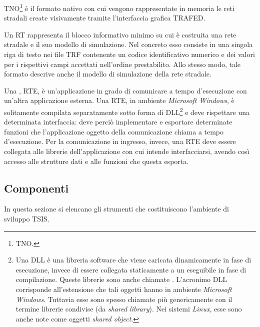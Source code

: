 \begin{definizione}\label{defn:tno-format}
\acs{TNO}\footnote{\acf{TNO}.} è il formato nativo con cui vengono rappresentate in memoria le reti stradali create visivamente tramite l'interfaccia grafica \acs{TRAFED}.
\end{definizione}

\begin{definizione}[\acl{RT}]\label{defn:tsis-rt}
Un \acf{RT} rappresenta il blocco informativo minimo su cui è costruita una rete stradale e il suo modello di simulazione. Nel concreto esso consiste in una singola riga di testo nei file \acs{TRF} contenente un codice identificativo numerico e dei valori per i rispettivi campi accettati nell'ordine prestabilito. Allo stesso modo, tale formato descrive anche il modello di simulazione della rete stradale.
\end{definizione}

\begin{definizione}\label{defn:rte}
Una , \acl{RTE}, è un'applicazione in grado di comunicare a tempo d'esecuzione con un'altra applicazione esterna. Una \acs{RTE}, in ambiente \emph{Microsoft Windows}, è solitamente compilata separatamente sotto forma di \acs{DLL}\footnote{Una \acf{DLL} è una libreria software che viene caricata dinamicamente in fase di esecuzione, invece di essere collegata staticamente a un eseguibile in fase di compilazione. Queste librerie sono anche chiamate . L'acronimo \acs{DLL} corrisponde all'estensione che tali oggetti hanno in ambiente \emph{Microsoft Windows}. Tuttavia esse sono spesso chiamate più genericamente con il termine librerie condivise (da \emph{shared library}). Nei sistemi \emph{Linux}, esse sono anche note come oggetti \emph{shared object}.} e deve rispettare una determinata interfaccia: deve perciò implementare e esportare determinate funzioni che l'applicazione oggetto della comunicazione chiama a tempo d'esecuzione. Per la comunicazione in ingresso, invece, una \acs{RTE} deve essere collegata alle librerie dell'applicazione con cui intende interfacciarsi, avendo così accesso alle strutture dati e alle funzioni che questa esporta.
\end{definizione}

\subsection{Componenti}\label{subsec:tsis-components}
In questa sezione si elencano gli strumenti che costituiscono l'ambiente di sviluppo \acs{TSIS}.

